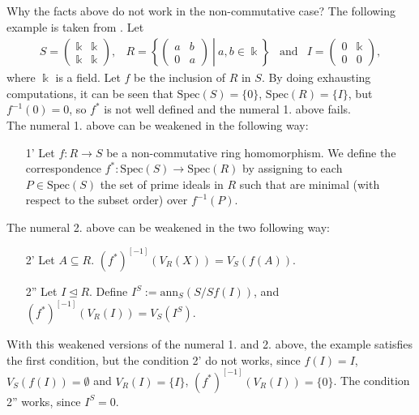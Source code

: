 \documentclass[final]{beamer}
\newlength{\colwidth}
\newcommand{\ideal}{\trianglelefteq}
\newcommand{\spec}{\mathrm{Spec}}
\newcommand{\ann}{\mathrm{ann}}
\begin{document}
\begin{frame}[t, fragile]
\begin{columns}[t]
\begin{column}{\colwidth}
\begin{alertblock}{Why the facts above do not work in the non-commutative case?}
    The following example is taken from \textbf{\cite{Letzter}}. Let
    \begin{equation*}
        \begin{array}{cccc}
             S=\begin{pmatrix}\Bbbk& \Bbbk \\\Bbbk& \Bbbk\end{pmatrix},& R=\left\{\begin{pmatrix}
                a & b \\ 0 & a                  
             \end{pmatrix}~\left|\right.~a,b\in\Bbbk\right\} & \text{and} & I=\begin{pmatrix}
                 0 & \Bbbk \\ 0 & 0
             \end{pmatrix},
        \end{array}
    \end{equation*}
    where $\Bbbk$ is a field. Let $f$ be the inclusion of $R$ in $S$. By doing exhausting computations, it can be seen that $\spec(S)=\{0\}$, $\spec(R)=\{I\}$, but $f^{-1}(0)=0$, so $f^*$ is not well defined and the numeral 1. above fails. \\ 
     The numeral 1. above can be weakened in the following way:
     \begin{enumerate}
         \item[1'] Let $f:R\to S$ be a non-commutative ring homomorphism. We define the correspondence $f^*:\spec(S)\to\spec(R)$ by assigning to each $P\in\spec(S)$ the set of prime ideals in $R$ such that are minimal (with respect to the subset order) over $f^{-1}(P)$. 
     \end{enumerate}
     The numeral 2. above can be weakened in the two following way:
     \begin{enumerate}
         \item[2'] Let $A\subseteq R$. $(f^*)^{[-1]}(V_R(X))=V_S(f(A))$.
         \item[2''] Let $I\ideal R$. Define $I^S:=\ann_S(S/Sf(I))$, and $(f^*)^{[-1]}(V_R(I))=V_S(I^S)$.
     \end{enumerate}
     With this weakened versions of the numeral 1. and 2. above, the example satisfies the first condition, but the condition 2' do not works, since $f(I)=I$, $V_S(f(I))=\emptyset$ and $V_R(I)=\{I\}$, $(f^*)^{[-1]}(V_R(I))=\{0\}$. The condition 2'' works, since $I^S=0$. 
  \end{alertblock}


\end{column}
\end{columns}
\end{frame}
\end{document}
